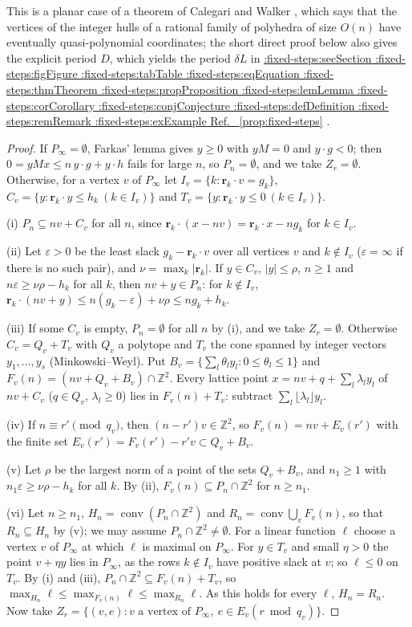 \documentclass[11pt,a4paper]{article}
\makeatletter
\def\Cref@getprefix#1:#2\relax{#1}
\def\Cref@prefix@sec{sec}
\def\Cref@prefix@fig{fig}
\def\Cref@prefix@tab{tab}
\def\Cref@prefix@eq{eq}
\def\Cref@prefix@thm{thm}
\def\Cref@prefix@prop{prop}
\def\Cref@prefix@lem{lem}
\def\Cref@prefix@cor{cor}
\def\Cref@prefix@conj{conj}
\def\Cref@prefix@def{def}
\def\Cref@prefix@rem{rem}
\def\Cref@prefix@ex{ex}
\def\Cref@type@cap#1{%
  \edef\Cref@tmp{#1}%
  \ifx\Cref@tmp\Cref@prefix@sec Section%
  \else\ifx\Cref@tmp\Cref@prefix@fig Figure%
  \else\ifx\Cref@tmp\Cref@prefix@tab Table%
  \else\ifx\Cref@tmp\Cref@prefix@eq Equation%
  \else\ifx\Cref@tmp\Cref@prefix@thm Theorem%
  \else\ifx\Cref@tmp\Cref@prefix@prop Proposition%
  \else\ifx\Cref@tmp\Cref@prefix@lem Lemma%
  \else\ifx\Cref@tmp\Cref@prefix@cor Corollary%
  \else\ifx\Cref@tmp\Cref@prefix@conj Conjecture%
  \else\ifx\Cref@tmp\Cref@prefix@def Definition%
  \else\ifx\Cref@tmp\Cref@prefix@rem Remark%
  \else\ifx\Cref@tmp\Cref@prefix@ex Example%
  \else Ref.%
  \fi\fi\fi\fi\fi\fi\fi\fi\fi\fi\fi\fi
}
\DeclareRobustCommand{\Cref}[1]{%
  \begingroup
  \edef\Cref@label{#1}%
  \edef\Cref@prefix{\expandafter\Cref@getprefix\Cref@label:\relax}%
  \hyperref[#1]{\Cref@type@cap{\Cref@prefix}~\ref*{#1}}%
  \endgroup
}
\theoremstyle{plain}
\theoremstyle{definition}
\theoremstyle{remark}
\newcommand{\Z}{\mathbb{Z}}
\makeatother
\begin{document}
This is a planar case of a theorem of Calegari and Walker \cite[Thm.~3.5]{calegari2013integer}, which says that the vertices of the integer hulls of a rational family of polyhedra of size $O(n)$ have eventually quasi-polynomial coordinates; the short direct proof below also gives the explicit period $D$, which yields the period $\delta L$ in \Cref{prop:fixed-steps}.

\begin{proof}
If $P_\infty=\emptyset$, Farkas' lemma gives $y\ge0$ with $yM=0$ and $y\cdot g<0$; then $0=yMx\le n\,y\cdot g+y\cdot h$ fails for large $n$, so $P_n=\emptyset$, and we take $Z_r=\emptyset$.
Otherwise, for a vertex $v$ of $P_\infty$ let $I_v=\{k:\mathbf r_k\cdot v=g_k\}$, $C_v=\{y:\mathbf r_k\cdot y\le h_k\ (k\in I_v)\}$ and $T_v=\{y:\mathbf r_k\cdot y\le0\ (k\in I_v)\}$.

(i) $P_n\subseteq nv+C_v$ for all $n$, since $\mathbf r_k\cdot(x-nv)=\mathbf r_k\cdot x-ng_k$ for $k\in I_v$.

(ii) Let $\varepsilon>0$ be the least slack $g_k-\mathbf r_k\cdot v$ over all vertices $v$ and $k\notin I_v$ ($\varepsilon=\infty$ if there is no such pair), and $\nu=\max_k|\mathbf r_k|$.
If $y\in C_v$, $|y|\le\rho$, $n\ge1$ and $n\varepsilon\ge\nu\rho-h_k$ for all $k$, then $nv+y\in P_n$: for $k\notin I_v$, $\mathbf r_k\cdot(nv+y)\le n(g_k-\varepsilon)+\nu\rho\le ng_k+h_k$.

(iii) If some $C_v$ is empty, $P_n=\emptyset$ for all $n$ by (i), and we take $Z_r=\emptyset$.
Otherwise $C_v=Q_v+T_v$ with $Q_v$ a polytope and $T_v$ the cone spanned by integer vectors $y_1,\dots,y_s$ (Minkowski--Weyl).
Put $B_v=\{\sum_l\theta_ly_l:0\le\theta_l\le1\}$ and $F_v(n)=(nv+Q_v+B_v)\cap\Z^2$.
Every lattice point $x=nv+q+\sum_l\lambda_ly_l$ of $nv+C_v$ ($q\in Q_v$, $\lambda_l\ge0$) lies in $F_v(n)+T_v$: subtract $\sum_l\lfloor\lambda_l\rfloor y_l$.

(iv) If $n\equiv r'\pmod{q_v}$, then $(n-r')v\in\Z^2$, so $F_v(n)=nv+E_v(r')$ with the finite set $E_v(r')=F_v(r')-r'v\subset Q_v+B_v$.

(v) Let $\rho$ be the largest norm of a point of the sets $Q_v+B_v$, and $n_1\ge1$ with $n_1\varepsilon\ge\nu\rho-h_k$ for all $k$. By (ii), $F_v(n)\subseteq P_n\cap\Z^2$ for $n\ge n_1$.

(vi) Let $n\ge n_1$, $H_n=\operatorname{conv}(P_n\cap\Z^2)$ and $R_n=\operatorname{conv}\bigcup_vF_v(n)$, so that $R_n\subseteq H_n$ by (v); we may assume $P_n\cap\Z^2\ne\emptyset$.
For a linear function $\ell$ choose a vertex $v$ of $P_\infty$ at which $\ell$ is maximal on $P_\infty$.
For $y\in T_v$ and small $\eta>0$ the point $v+\eta y$ lies in $P_\infty$, as the rows $k\notin I_v$ have positive slack at $v$; so $\ell\le0$ on $T_v$.
By (i) and (iii), $P_n\cap\Z^2\subseteq F_v(n)+T_v$, so $\max_{H_n}\ell\le\max_{F_v(n)}\ell\le\max_{R_n}\ell$.
As this holds for every $\ell$, $H_n=R_n$.
Now take $Z_r=\{(v,e):v\text{ a vertex of }P_\infty,\ e\in E_v(r\bmod q_v)\}$.
\end{proof}
\end{document}
